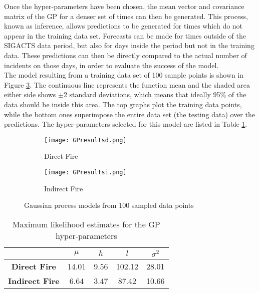 \documentclass[a4paper,11pt]{report}
\begin{document}
Once the hyper-parameters have been chosen, the mean vector and covariance matrix of the GP for a denser set of times can then be generated. This process, known as inference, allows predictions to be generated for times which do not appear in the training data set. Forecasts can be made for times outside of the SIGACTS data period, but also for days inside the period but not in the training data. These predictions can then be directly compared to the actual number of incidents on those days, in order to evaluate the success of the model. \\

The model resulting from a training data set of 100 sample points is shown in Figure \ref{fig:GPresults}. The continuous line represents the function mean and the shaded area either side shows \(\pm\)2 standard deviations, which means that ideally 95\% of the data should be inside this area. The top graphs plot the training data points, while the bottom ones superimpose the entire data set (the testing data) over the predictions. The hyper-parameters selected for this model are listed in Table \ref{GPhyperparameters}.

\begin{figure}
\centering
\begin{subfigure}{.5\textwidth}
	\centering
	\texttt{[image: GPresultsd.png]}
  	\caption{Direct Fire}
  	\label{fig:sub1}
\end{subfigure}%
\begin{subfigure}{.5\textwidth}
  	\centering
  	\texttt{[image: GPresultsi.png]}
  	\caption{Indirect Fire}
 	 \label{fig:sub2}
\end{subfigure}
\caption{Gaussian process models from 100 sampled data points}
\label{fig:GPresults}
\end{figure}

\singlespacing
\begin{table}[]
\centering
\caption{Maximum likelihood estimates for the GP hyper-parameters}
\label{GPhyperparameters}
\begin{tabular}{c|c|c|c|c|}
\cline{2-5}
\textbf{}                                    & \(\mu\) & \(h\) & \(l\) & \(\sigma^2\) \\ \hline
\multicolumn{1}{|c|}{\textbf{Direct Fire}}   & 14.01           & 9.56          & 102.12          & 28.01              \\ \hline
\multicolumn{1}{|c|}{\textbf{Indirect Fire}} & 6.64           & 3.47          & 87.42          & 10.66              \\ \hline
\end{tabular}
\end{table}
\doublespacing
\end{document}
